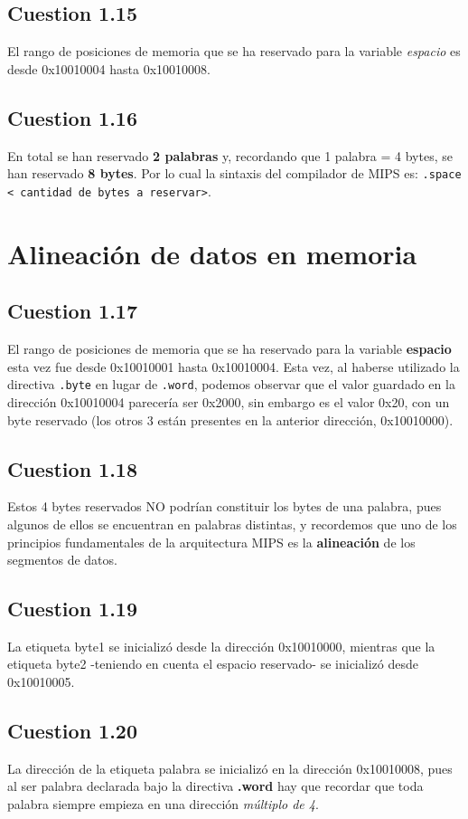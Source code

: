 \documentclass[11pt]{article}
\begin{document}
\begin{large}
\begin{flushleft}
\subsection*{Cuestion 1.15}
El rango de posiciones de memoria que se ha reservado para la variable \textit{espacio} es desde 0x10010004 hasta 0x10010008. 

\subsection*{Cuestion 1.16}
En total se han reservado \textbf{2 palabras} y, recordando que 1 palabra = 4 bytes, se han reservado \textbf{8 bytes}. Por lo cual la sintaxis del compilador de MIPS es: \texttt{.space < cantidad de bytes a reservar>}.


\section*{Alineación de datos en memoria}

\subsection*{Cuestion 1.17}
El rango de posiciones de memoria que se ha reservado para la variable \textbf{espacio} esta vez fue desde 0x10010001 hasta 0x10010004. Esta vez, al haberse utilizado la directiva \texttt{.byte} en lugar de \texttt{.word}, podemos observar que el valor guardado en la dirección 0x10010004 parecería ser 0x2000, sin embargo es el valor 0x20, con un byte reservado (los otros 3 están presentes en la anterior dirección, 0x10010000).

\subsection*{Cuestion 1.18}
Estos 4 bytes reservados NO podrían constituir los bytes de una palabra, pues algunos de ellos se encuentran en palabras distintas, y recordemos que uno de los principios fundamentales de la arquitectura MIPS es la \textbf{alineación} de los segmentos de datos.

\subsection*{Cuestion 1.19}
La etiqueta byte1 se inicializó desde la dirección 0x10010000, mientras que la etiqueta byte2 -teniendo en cuenta el espacio reservado- se inicializó desde 0x10010005.

\subsection*{Cuestion 1.20}
La dirección de la etiqueta palabra se inicializó en la dirección 0x10010008, pues al ser palabra declarada bajo la directiva \textbf{.word} hay que recordar que toda palabra siempre empieza en una dirección \textit{múltiplo de 4}.


\end{flushleft}
\end{large}
\end{document}
